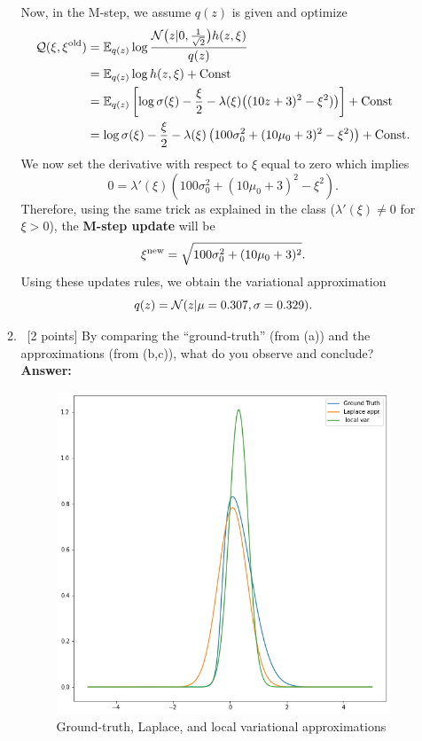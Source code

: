 \documentclass[12pt, fullpage,letterpaper]{article}
\def\red{\color{black!30!red}}
\def\blackblue{\color{black!40!blue}}
\begin{document}
\begin{enumerate}
\begin{enumerate}
{Now, in the M-step, we assume $q(z)$ is given and optimize 
\begin{align*}
\mathcal{Q}(\xi,\xi^{\rm old}) 
& = \displaystyle\mathbb{E}_{q(z)}\log \frac{\mathcal{N}\big(z|0,\frac{1}{\sqrt{2}}\big)h(z,\xi)}{q(z)}\\
& = \mathbb{E}_{q(z)}\log h(z,\xi) + {\rm Const}\\
& = \mathbb{E}_{q(z)}\left[\log \sigma(\xi) - \frac{\xi}{2}-\lambda(\xi)\big((10z+3)^2-\xi^2)\big)\right]+ {\rm Const}\\
& = \log \sigma(\xi) - \frac{\xi}{2} -\lambda(\xi)\left(100\sigma^2_0 +(10\mu_0+3)^2 -\xi^2)\right) + {\rm Const}.
\end{align*}
We now set the derivative with respect to $\xi$ equal to zero which implies 
$$0 = \lambda'(\xi)\left(100\sigma^2_0 +(10\mu_0+3)^2 -\xi^2\right).$$
Therefore, using the same trick as explained in the class ($\lambda'(\xi)\neq 0$ for $\xi>0$),
the {\bf M-step update} will be 
\begin{equation}\label{M_step}
\xi^{\rm new} =\sqrt{100\sigma^2_0 +(10\mu_0+3)^2}.
\end{equation}
Using these updates rules, we obtain the variational approximation  
$$q(z) = \mathcal{N}(z|\mu = 0.307,\sigma = 0.329).$$
}

		\item~[2 points] By comparing the ``ground-truth'' (from (a)) and the approximations (from (b,c)), what do you observe and conclude?\\
{\bf \red Answer: }{\blackblue 
\begin{figure}[h]
\centering
\includegraphics[width=0.5\linewidth]{Images/Q1.png} 
\caption{Ground-truth, Laplace, and local variational approximations} \label{fig:Q1}
\end{figure}
}

	\end{enumerate}


\end{enumerate}
\end{document}
